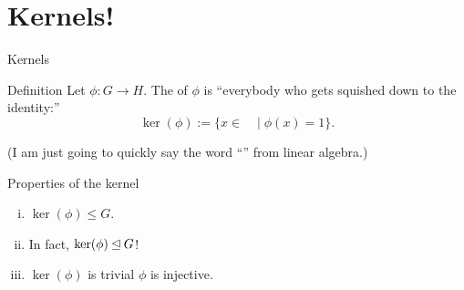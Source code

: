\documentclass[8pt, handout]{beamer}
\begin{document}
\section{Kernels!}

\begin{frame}{Kernels}
  \begin{block}{Definition}
    Let $\phi:G\to H$. The  of $\phi$ is ``everybody who gets squished down to the identity:'' \pause
    \[\ker(\phi):= \{x\in \phantom{G} \mid \phi(x) = 1\}. \]
  \end{block} \pause
  (I am just going to quickly say the word ``'' from linear algebra.) \pause
  \begin{exampleblock}{Properties of the kernel}
    \begin{enumerate}[(i)]
      \item $\ker(\phi) \leq G$. \pause
      \item In fact, $\ker(\phi) \unlhd G$! \pause
      \item $\ker(\phi)$ is trivial  $\phi$ is injective.
    \end{enumerate}
  \end{exampleblock}
\end{frame}

\end{document}
